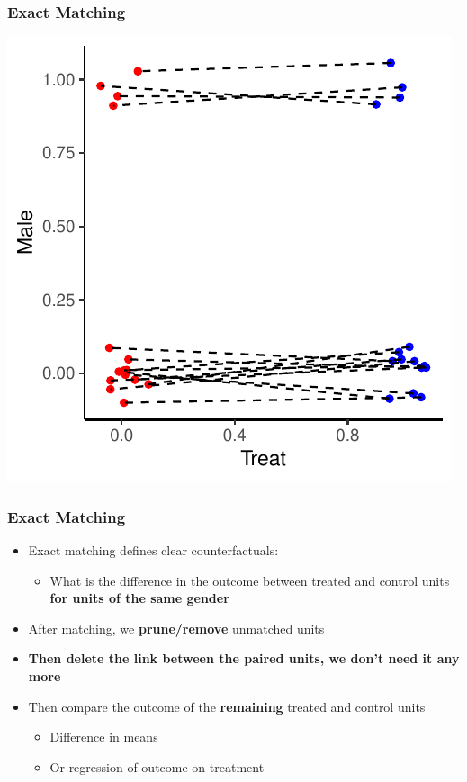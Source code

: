 \documentclass[xcolor=x11names,compress]{beamer}\usepackage[]{graphicx}\usepackage[]{color}
\makeatletter
\def\maxwidth{ %
  \ifdim\Gin@nat@width>\linewidth
    \linewidth
  \else
    \Gin@nat@width
  \fi
}
\newenvironment{knitrout}{}{} %
\renewcommand{\(}{\begin{columns}}
\renewcommand{\)}{\end{columns}}
\newcommand{\<}[1]{\begin{column}{#1}}
\renewcommand{\>}{\end{column}}
\makeatother
\begin{document}
\begin{frame}
\frametitle{Exact Matching}
\begin{center}
\begin{knitrout}
\color{fgcolor}
\includegraphics[width=\maxwidth]{figure/exact_matching_3-1} 

\end{knitrout}
\end{center}
\end{frame}

\begin{frame}
\frametitle{Exact Matching}
\begin{itemize}
\item Exact matching defines clear counterfactuals:
\begin{itemize}
\item What is the difference in the outcome between treated and control units \textbf{for units of the same gender}
\pause
\end{itemize}
\item After matching, we \textbf{prune/remove} unmatched units
\pause
\item \textbf{Then delete the link between the paired units, we don't need it any more}
\pause
\item Then compare the outcome of the \textbf{remaining} treated and control units
\pause
\begin{itemize}
\item Difference in means
\pause
\item Or regression of outcome on treatment
\end{itemize}
\end{itemize}
\end{frame}
\end{document}
